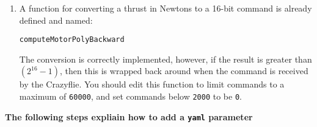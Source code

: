 \documentclass[]{report}
\newcommand{\convertnewtonsintocommandfunction}{computeMotorPolyBackward}
\begin{document}
\begin{enumerate}[topsep=-1pt , itemsep=1pt ,  label = \textbf{(\arabic{*})} ]
		\item A function for converting a thrust in Newtons to a 16-bit command is already defined and named:
		\begin{center}
			\texttt{\convertnewtonsintocommandfunction}
		\end{center}
		The conversion is correctly implemented, however, if the result is greater than ${(2^{16}\!-\!1)}$, then this is wrapped back around when the command is received by the Crazyflie. You should edit this function to limit commands to a maximum of \texttt{60000}, and set commands below \texttt{2000} to be \texttt{0}.
		
	\end{enumerate}

	\clearpage

	\begin{center}
		\textbf{The following steps expliain how to add a \texttt{yaml} parameter}
	\end{center}
	
\end{document}

